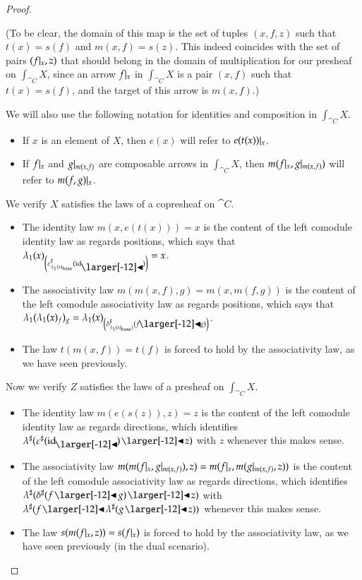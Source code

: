 \documentclass{amsart}
\begin{document}
\begin{proof}
\begin{itemize}
    (To be clear, the domain of this map is the set of tuples
    $(x, f, z)$ such that $t(x) = s(f)$ and $m(x, f) = s(z)$. This
    indeed coincides with the set of pairs $(f|_{x}, z)$ that
    should belong in the domain of multiplication for our presheaf on
    $\int_{\cat{C}}X$, since an arrow $f|_{x}$ in
    $\int_{\cat{C}}X$ is a pair $(x, f)$ such that $t(x) = s(f)$, and
    the target of this arrow is $m(x, f)$.)
  \end{itemize}

  We will also use the following notation for identities and
  composition in $\int_{\cat{C}}X$.
  \begin{itemize}
  \item If $x$ is an element of $X$, then $e(x)$ will refer to
    $e(t(x))|_{x}$.
  \item If $f|_{x}$ and $g|_{m(x,f)}$ are composable arrows in
    $\int_{\cat{C}}X$, then $m(f|_{x}, g|_{m(x,f)})$ will refer to
    $m(f, g)|_{x}$.
  \end{itemize}

  We verify $X$ satisfies the laws of a copresheaf on $\cat{C}$.
  \begin{itemize}
  \item The identity law $m(x, e(t(x))) = x$ is the content of the left
    comodule identity law as regards positions, which says that
    $\posmapof{\lambda}{x}_{\left(\dirmapof{\varepsilon}{\posmapof{\lambda}{x}_\base}{\idsubd}\right)} = x$.
  \item The associativity law $m(m(x, f), g) = m(x, m(f, g))$ is the
    content of the left comodule associativity law as regards positions,
    which says that
    $\posmapof{\lambda}{\posmapof{\lambda}{x}_f}_g =
    \posmapof{\lambda}{x}_{\left(\dirmapof{\delta}{\posmapof{\lambda}{x}_\base)}{f
        \subd g}\right)}$.
  \item The law $t(m(x, f)) = t(f)$ is forced to hold by the
    associativity law, as we have seen previously.
  \end{itemize}
  
  Now we verify $Z$ satisfies the laws of a presheaf on $\int_{\cat{C}}X$.
  \begin{itemize}
  \item The identity law $m(e(s(z)), z) = z$ is the content of the left
    comodule identity law as regards directions, which identifies
    ${\anydirmapof{\lambda}{\anydirmapof{\varepsilon}{\idsubd} \subd z}}$
    with $z$ whenever this makes sense.
  \item The associativity law
    $m(m(f|_{x}, g|_{m(x,f)}), z) = m(f|_{x}, m(g|_{m(x,f)}, z))$ is the
    content of the left comodule associativity law as regards
    directions, which identifies
    ${\anydirmapof{\lambda}{\anydirmapof{\delta}{f \subd g} \subd z}}$
    with
    ${\anydirmapof{\lambda}{f \subd \anydirmapof{\lambda}{g \subd z}}}$
    whenever this makes sense.
  \item The law $s(m(f|_{x}, z)) = s(f|_{x})$ is forced to hold by the
    associativity law, as we have seen previously (in the dual
    scenario).
  \end{itemize}


\end{proof}
\end{document}
